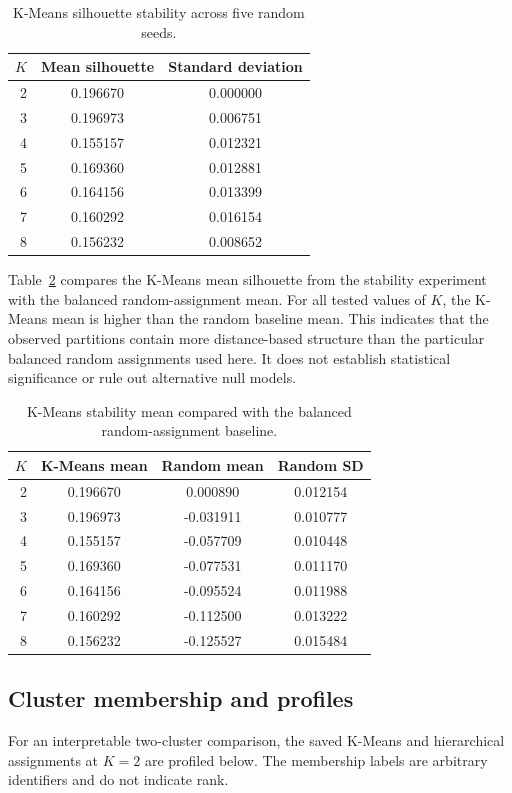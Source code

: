 \documentclass[11pt,a4paper]{article}
\begin{document}
\begin{table}[H]
\centering
\caption{K-Means silhouette stability across five random seeds.}
\label{tab:stability}
\small
\begin{tabular}{rcc}
\toprule
$K$ & Mean silhouette & Standard deviation\\
\midrule
2 & 0.196670 & 0.000000\\
3 & 0.196973 & 0.006751\\
4 & 0.155157 & 0.012321\\
5 & 0.169360 & 0.012881\\
6 & 0.164156 & 0.013399\\
7 & 0.160292 & 0.016154\\
8 & 0.156232 & 0.008652\\
\bottomrule
\end{tabular}
\end{table}

Table~\ref{tab:baseline} compares the K-Means mean silhouette from the stability experiment with the balanced random-assignment mean. For all tested values of $K$, the K-Means mean is higher than the random baseline mean. This indicates that the observed partitions contain more distance-based structure than the particular balanced random assignments used here. It does not establish statistical significance or rule out alternative null models.

\begin{table}[H]
\centering
\caption{K-Means stability mean compared with the balanced random-assignment baseline.}
\label{tab:baseline}
\small
\begin{tabular}{rccc}
\toprule
$K$ & K-Means mean & Random mean & Random SD\\
\midrule
2 & 0.196670 & 0.000890 & 0.012154\\
3 & 0.196973 & -0.031911 & 0.010777\\
4 & 0.155157 & -0.057709 & 0.010448\\
5 & 0.169360 & -0.077531 & 0.011170\\
6 & 0.164156 & -0.095524 & 0.011988\\
7 & 0.160292 & -0.112500 & 0.013222\\
8 & 0.156232 & -0.125527 & 0.015484\\
\bottomrule
\end{tabular}
\end{table}

\subsection{Cluster membership and profiles}
For an interpretable two-cluster comparison, the saved K-Means and hierarchical assignments at $K=2$ are profiled below. The membership labels are arbitrary identifiers and do not indicate rank.
\end{document}
